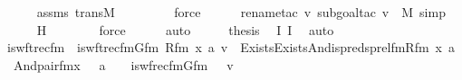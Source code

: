 \begin{isabellebody}
\ \ \ \ \isamarkupfalse%
\ assms\ transM\ \isanewline
\ \ \ \ \ \ \isamarkupfalse%
\ force\isanewline
\ \ \ \ \ \isamarkupfalse%
{\isacharparenleft}{\kern0pt}rename{\isacharunderscore}{\kern0pt}tac\ v{\isacharcomma}{\kern0pt}\ subgoal{\isacharunderscore}{\kern0pt}tac\ {\isachardoublequoteopen}v\ {\isasymin}\ M{\isachardoublequoteclose}{\isacharcomma}{\kern0pt}\ simp{\isacharparenright}{\kern0pt}\isanewline
\ \ \ \ \isamarkupfalse%
\ H\ \isanewline
\ \ \ \ \ \isamarkupfalse%
\ force\isanewline
\ \ \ \ \isamarkupfalse%
\ auto\isanewline
\isanewline
\ \ \isamarkupfalse%
\ \isamarkupfalse%
\ {\isacharquery}{\kern0pt}thesis\ \isamarkupfalse%
\ I{}\ I{}\ \isamarkupfalse%
\ auto\isanewline
{}\isamarkupfalse%
%
\endisatagproof
{\isafoldproof}%
%
\isadelimproof
\isanewline
%
\endisadelimproof
\isanewline
{}\isamarkupfalse%
\isanewline
\isanewline
{}\isamarkupfalse%
\ is{\isacharunderscore}{\kern0pt}wftrec{\isacharunderscore}{\kern0pt}fm\ \ {\isachardoublequoteopen}is{\isacharunderscore}{\kern0pt}wftrec{\isacharunderscore}{\kern0pt}fm{\isacharparenleft}{\kern0pt}Gfm{\isacharcomma}{\kern0pt}\ Rfm{\isacharcomma}{\kern0pt}\ x{\isacharcomma}{\kern0pt}\ a{\isacharcomma}{\kern0pt}\ v{\isacharparenright}{\kern0pt}\ {\isasymequiv}\ Exists{\isacharparenleft}{\kern0pt}Exists{\isacharparenleft}{\kern0pt}And{\isacharparenleft}{\kern0pt}is{\isacharunderscore}{\kern0pt}preds{\isacharunderscore}{\kern0pt}prel{\isacharunderscore}{\kern0pt}fm{\isacharparenleft}{\kern0pt}Rfm{\isacharcomma}{\kern0pt}\ x{\isacharhash}{\kern0pt}{\isacharplus}{\kern0pt}{}{\isacharcomma}{\kern0pt}\ a{\isacharhash}{\kern0pt}{\isacharplus}{\kern0pt}{}{\isacharcomma}{\kern0pt}\ {}{\isacharparenright}{\kern0pt}{\isacharcomma}{\kern0pt}\ And{\isacharparenleft}{\kern0pt}pair{\isacharunderscore}{\kern0pt}fm{\isacharparenleft}{\kern0pt}x\ {\isacharhash}{\kern0pt}{\isacharplus}{\kern0pt}\ {}{\isacharcomma}{\kern0pt}\ a\ {\isacharhash}{\kern0pt}{\isacharplus}{\kern0pt}\ {}{\isacharcomma}{\kern0pt}\ {}{\isacharparenright}{\kern0pt}{\isacharcomma}{\kern0pt}\ is{\isacharunderscore}{\kern0pt}wfrec{\isacharunderscore}{\kern0pt}fm{\isacharparenleft}{\kern0pt}Gfm{\isacharcomma}{\kern0pt}\ {}{\isacharcomma}{\kern0pt}\ {}{\isacharcomma}{\kern0pt}\ v\ {\isacharhash}{\kern0pt}{\isacharplus}{\kern0pt}\ {}{\isacharparenright}{\kern0pt}{\isacharparenright}{\kern0pt}{\isacharparenright}{\kern0pt}{\isacharparenright}{\kern0pt}{\isacharparenright}{\kern0pt}{\isachardoublequoteclose}\ \isanewline

\end{isabellebody}
